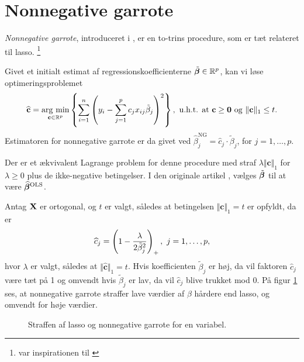 \section{Nonnegative garrote} \label{sec:nonnegativegarrote}
\textit{Nonnegative garrote}, introduceret i \citep{nonnegative_garrote}, er en to-trins procedure, som er tæt relateret til lasso. \footnote{\citep{nonnegative_garrote} var inspirationen til \citep{lasso}} 
\begin{defn}
Givet et initialt estimat af regressionskoefficienterne \(\tilde{\boldsymbol{\beta}} \in \mathbb{R}^p\), kan vi løse optimeringsproblemet
\begin{align}
\widehat{\mathbf{c}} = \argmin_{\mathbf{c} \in \mathbb{R}^p}  \cbr{ \sum_{i=1}^n \del{y_i - \sum_{j=1}^p c_j x_{ij} \tilde{\beta}_j}^2}, \ \text{u.h.t. at } \mathbf{c} \geq \mathbf{0} \text{ og } \Vert \mathbf{c} \Vert_1 \leq t. \label{eq:2.19}
\end{align}
Estimatoren for nonnegative garrote er da givet ved \(\widehat{\beta}_j^\text{NG} = \widehat{c}_j \cdot \tilde{\beta}_j\), for \(j = 1, \ldots, p\).
\end{defn}
Der er et ækvivalent Lagrange problem for denne procedure med straf \(\lambda \Vert \mathbf{c} \Vert_1\) for \(\lambda \geq 0\) plus de ikke-negative betingelser.
I den originale artikel \citep{nonnegative_garrote}, vælges \(\tilde{\boldsymbol{\beta}}\) til at være \(\widehat{\boldsymbol{\beta}}^\text{OLS}\).
 
Antag \(\mathbf{X}\) er ortogonal, og \(t\) er valgt, således at betingelsen \(\Vert \mathbf{c} \Vert_1 = t\) er opfyldt, da er
\begin{align*}
\widehat{c}_j = \del{1 - \frac{\lambda}{2\tilde{\beta}_j^2}}_+, \ j = 1, \ldots, p,
\end{align*}
hvor \(\lambda\) er valgt, således at \(\Vert \widehat{\mathbf{c}} \Vert_1 = t\).
Hvis koefficienten \(\tilde{\beta}_j\) er høj, da vil faktoren \(\widehat{c}_j\) være tæt på 1 og omvendt hvis \(\tilde{\beta}_j\) er lav, da vil \(\widehat{c}_j\) blive trukket mod 0.
På figur \ref{fig:nonnegative_garrote} ses, at nonnegative garrote straffer lave værdier af \(\beta\) hårdere end lasso, og omvendt for høje værdier.
%
\begin{figure}[H]
\centering
\scalebox{0.8}{}
\caption{Straffen af lasso og nonnegative garrote for en variabel. 
} \label{fig:nonnegative_garrote}
\end{figure}
%

